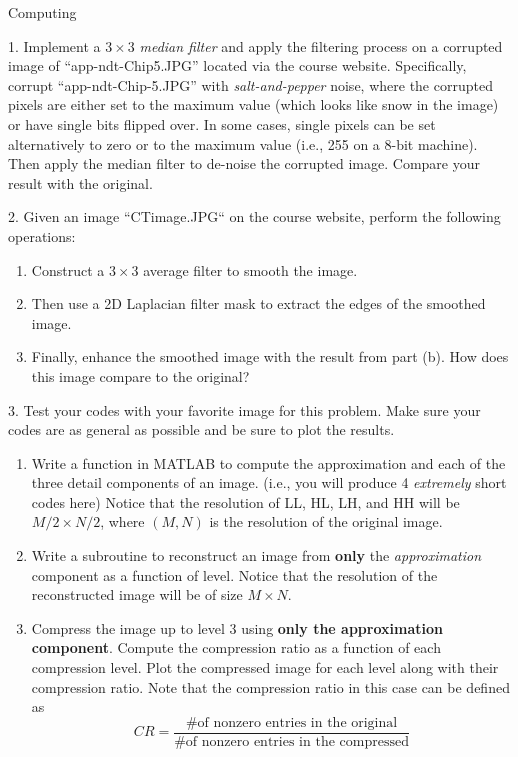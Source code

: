 \begin{section}{Computing}
\begin{homeworkSection}{1. }
Implement a $3 \times 3$ \textit{median filter} and apply the filtering  process on a corrupted image of “app-ndt-Chip5.JPG”
located via the course website. Specifically, corrupt “app-ndt-Chip-5.JPG” with \textit{salt-and-pepper} noise, where the corrupted pixels are either set to the maximum value (which looks like snow in the image) or have single bits flipped over. In some cases, single pixels can be set alternatively to zero or to the maximum value (i.e., 255 on a 8-bit machine). Then apply the median filter to de-noise the corrupted image. Compare your result with the original.
\end{homeworkSection}

\begin{homeworkSection}{2. }
Given an image “CTimage.JPG“ on the course website, perform the following operations:
\renewcommand{\theenumi}{\alph{enumi}}
\begin{enumerate}
	\item Construct a $3 \times 3$ average filter to smooth the image.
	\item Then use a 2D Laplacian filter mask to extract the edges of the smoothed image.
	\item Finally, enhance the smoothed image with the result from part (b). How does this image compare to the original?
\end{enumerate}
\end{homeworkSection}

\begin{homeworkSection}{3. }
Test your codes with your favorite image for this problem. Make sure your codes are as general as possible and be sure to plot the results.
\renewcommand{\theenumi}{\alph{enumi}}
\begin{enumerate}
	\item Write a function in \textsc{MATLAB} to compute the approximation and each of the three detail components of an image. (i.e., you will produce 4 \textit{extremely} short codes here) Notice that the resolution of LL, HL, LH, and HH will be $M/2 \times N/2$, where $(M,N)$ is the resolution of the original image.
	\item Write a subroutine to reconstruct an image from \textbf{only} the \textit{approximation} component as a function of level. Notice that the resolution of the reconstructed image will be of size $M\times N$.
	\item Compress the image up to level 3 using \textbf{only the approximation component}. Compute the compression ratio as a function of each compression level. Plot the compressed image for each level along with their compression ratio. Note that the compression ratio in this case can be defined as
	$$
		CR = \frac{ \text{\# of nonzero entries in the original} }{ \text{\# of nonzero entries in the compressed} }
	$$
\end{enumerate}
\end{homeworkSection}

\end{section}

